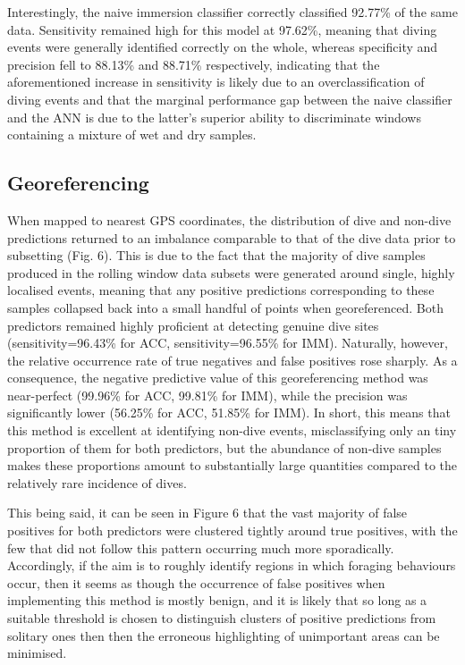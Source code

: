 \documentclass[11pt]{article}
\begin{document}
    Interestingly, the naive immersion classifier correctly classified 92.77\% of the same data. Sensitivity remained high for this model at 97.62\%, meaning that diving events were generally identified correctly on the whole, whereas specificity and precision fell to 88.13\% and 88.71\% respectively, indicating that the aforementioned increase in sensitivity is likely due to an overclassification of diving events and that the marginal performance gap between the naive classifier and the ANN is due to the latter's superior ability to discriminate windows containing a mixture of wet and dry samples.
    
    \subsection{Georeferencing}
    When mapped to nearest GPS coordinates, the distribution of dive and non-dive predictions returned to an imbalance comparable to that of the dive data prior to subsetting (Fig. 6). This is due to the fact that the majority of dive samples produced in the rolling window data subsets were generated around single, highly localised events, meaning that any positive predictions corresponding to these samples collapsed back into a small handful of points when georeferenced. Both predictors remained highly proficient at detecting genuine dive sites (sensitivity=96.43\% for ACC, sensitivity=96.55\% for IMM). Naturally, however, the relative occurrence rate of true negatives and false positives rose sharply. As a consequence, the negative predictive value of this georeferencing method was near-perfect (99.96\% for ACC, 99.81\% for IMM), while the precision was significantly lower (56.25\% for ACC, 51.85\% for IMM). In short, this means that this method is excellent at identifying non-dive events, misclassifying only an tiny proportion of them for both predictors, but the abundance of non-dive samples makes these proportions amount to substantially large quantities compared to the relatively rare incidence of dives. 
    
    This being said, it can be seen in Figure 6 that the vast majority of false positives for both predictors were clustered tightly around true positives, with the few that did not follow this pattern occurring much more sporadically. Accordingly, if the aim is to roughly identify regions in which foraging behaviours occur, then it seems as though the occurrence of false positives when implementing this method is mostly benign, and it is likely that so long as a suitable threshold is chosen to distinguish clusters of positive predictions from solitary ones then then the erroneous highlighting of unimportant areas can be minimised. 
\end{document}
